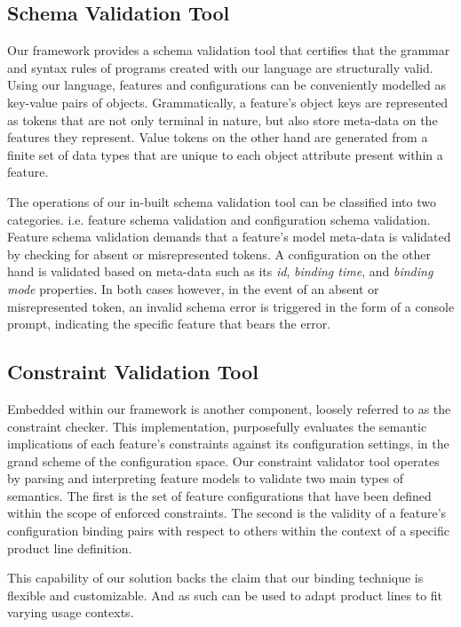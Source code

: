 \documentclass[conference]{IEEEtran}
\begin{document}
  \subsection{Schema Validation Tool} Our framework provides a schema validation tool that certifies that the grammar and syntax rules of programs created with our language are structurally valid. Using our language, features and configurations can be conveniently modelled as key-value pairs of objects. Grammatically, a feature's object keys are represented as tokens that are not only terminal in nature, but also store meta-data on the features they represent. Value tokens on the other hand are generated from a finite set of data types that are unique to each object attribute present within a feature.
  
  The operations of our in-built schema validation tool can be classified into two categories. i.e. feature schema validation and configuration schema validation. Feature schema validation demands that a feature's model meta-data is validated by checking for absent or misrepresented tokens. A configuration on the other hand is validated based on meta-data such as its \textit{id}, \textit{binding time}, and \textit{binding mode} properties. In both cases however, in the event of an absent or misrepresented token, an invalid schema error is triggered in the form of a console prompt, indicating the specific feature that bears the error.
  
  \subsection{Constraint Validation Tool} Embedded within our framework is another component, loosely referred to as the constraint checker. This implementation, purposefully evaluates the semantic implications of each feature's constraints against its configuration settings, in the grand scheme of the configuration space. Our constraint validator tool operates by parsing and interpreting feature models to validate two main types of semantics. The first is the set of feature configurations that have been defined within the scope of enforced constraints. The second is the validity of a feature's configuration binding pairs with respect to others within the context of a specific product line definition.
  
 This capability of our solution backs the claim that our binding technique is flexible and customizable. And as such can be used to adapt product lines to fit varying usage contexts.
\end{document}
